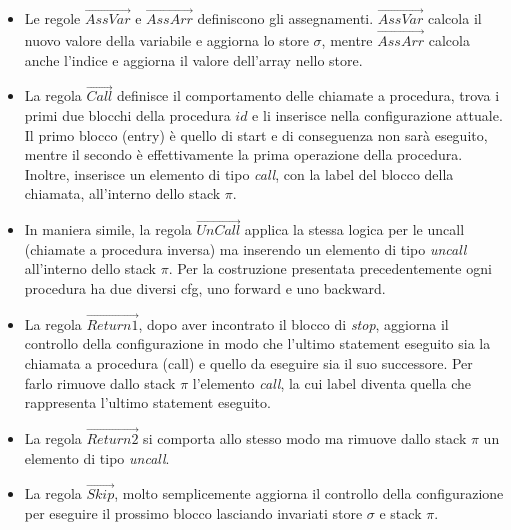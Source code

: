 \documentclass{article}
\theoremstyle{plain}
\theoremstyle{definition}
\theoremstyle{plain}
\newcommand{\s}{\pi}
\begin{document}
\begin{itemize}

\item Le regole $\overrightarrow{\mathit{AssVar}}$ e $\overrightarrow{\mathit{AssArr}}$ definiscono gli assegnamenti. $\overrightarrow{\mathit{AssVar}}$ calcola il nuovo valore della variabile e aggiorna lo store $\sigma$, mentre $\overrightarrow{\mathit{AssArr}}$ calcola anche l'indice e aggiorna il valore dell'array nello store.

\item La regola $\overrightarrow{\mathit{Call}}$ definisce il comportamento delle chiamate a procedura, trova i primi due blocchi della procedura $id$ e li inserisce nella configurazione attuale. Il primo blocco (entry) è quello di start e di conseguenza non sarà eseguito, mentre il secondo è effettivamente la prima operazione della procedura. Inoltre, inserisce un elemento di tipo \emph{call}, con la label del blocco della chiamata, all'interno dello stack $\s$.

\item In maniera simile, la regola $\overrightarrow{\mathit{UnCall}}$ applica la stessa logica per le uncall (chiamate a procedura inversa) ma inserendo un elemento di tipo \emph{uncall} all'interno dello stack $\s$. Per la costruzione presentata precedentemente ogni procedura ha due diversi cfg, uno forward e uno backward.

\item La regola $\overrightarrow{\mathit{Return1}}$, dopo aver incontrato il blocco di \emph{stop}, aggiorna il controllo della configurazione in modo che l'ultimo statement eseguito sia la chiamata a procedura (call) e quello da eseguire sia il suo successore. Per farlo rimuove dallo stack $\s$ l'elemento \emph{call}, la cui label diventa quella che rappresenta l'ultimo statement eseguito.

\item La regola $\overrightarrow{\mathit{Return2}}$ si comporta allo stesso modo ma rimuove dallo stack $\s$ un elemento di tipo \emph{uncall}.

\item La regola $\overrightarrow{\mathit{Skip}}$, molto semplicemente aggiorna il controllo della configurazione per eseguire il prossimo blocco lasciando invariati store $\sigma$ e stack $\s$.

\end{itemize}
\end{document}

